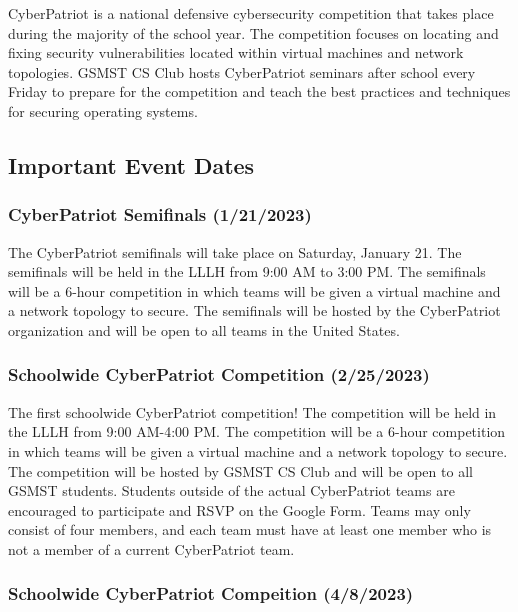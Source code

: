 \documentclass[
  letterpaper,
  DIV=11,
  numbers=noendperiod]{scrartcl}
\begin{document}
CyberPatriot is a national defensive cybersecurity competition that
takes place during the majority of the school year. The competition
focuses on locating and fixing security vulnerabilities located within
virtual machines and network topologies. GSMST CS Club hosts
CyberPatriot seminars after school every Friday to prepare for the
competition and teach the best practices and techniques for securing
operating systems.

\hypertarget{important-event-dates-1}{%
\subsection{Important Event Dates}\label{important-event-dates-1}}

\hypertarget{cyberpatriot-semifinals-1212023}{%
\subsubsection{CyberPatriot Semifinals
(1/21/2023)}\label{cyberpatriot-semifinals-1212023}}

The CyberPatriot semifinals will take place on Saturday, January 21. The
semifinals will be held in the LLLH from 9:00 AM to 3:00 PM. The
semifinals will be a 6-hour competition in which teams will be given a
virtual machine and a network topology to secure. The semifinals will be
hosted by the CyberPatriot organization and will be open to all teams in
the United States.

\hypertarget{schoolwide-cyberpatriot-competition-2252023}{%
\subsubsection{Schoolwide CyberPatriot Competition
(2/25/2023)}\label{schoolwide-cyberpatriot-competition-2252023}}

The first schoolwide CyberPatriot competition! The competition will be
held in the LLLH from 9:00 AM-4:00 PM. The competition will be a 6-hour
competition in which teams will be given a virtual machine and a network
topology to secure. The competition will be hosted by GSMST CS Club and
will be open to all GSMST students. Students outside of the actual
CyberPatriot teams are encouraged to participate and RSVP on the Google
Form. Teams may only consist of four members, and each team must have at
least one member who is not a member of a current CyberPatriot team.

\hypertarget{schoolwide-cyberpatriot-compeition-482023}{%
\subsubsection{Schoolwide CyberPatriot Compeition
(4/8/2023)}\label{schoolwide-cyberpatriot-compeition-482023}}
\end{document}

